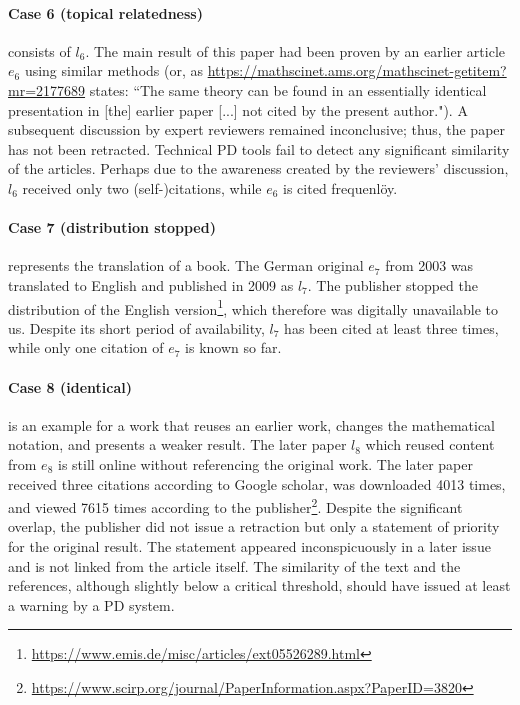 \documentclass{llncs}
\begin{document}
\paragraph{Case 6 (topical relatedness)} consists of $l_6$. The main result of this paper had been proven by an earlier article $e_6$ using similar methods (or, as \url{https://mathscinet.ams.org/mathscinet-getitem?mr=2177689} states: ``The same theory can be found in an essentially identical presentation in [the] earlier paper [...] not cited by the present author."). A subsequent discussion by expert reviewers remained inconclusive; thus, the paper has not been retracted. Technical PD tools fail to detect any significant similarity of the articles. Perhaps due to the awareness created by the reviewers' discussion, $l_6$ received only two (self-)citations, while $e_6$ is cited frequenlöy.

\paragraph{Case 7 (distribution stopped)} represents the translation of a book. The German original $e_7$ from 2003 was translated to English and published in 2009 as $l_7$.
The publisher stopped the distribution of the English version\footnote{\url{https://www.emis.de/misc/articles/ext05526289.html}}, which therefore was digitally unavailable to us. Despite its short period of availability, $l_7$ has been cited at least three times, while only one citation of $e_7$ is known so far.

\paragraph{Case 8 (identical)} is an example for a work that reuses an earlier work, changes the mathematical notation, and presents a weaker result. The later paper $l_8$ which reused content from $e_8$ is still online without referencing the original work. The later paper received three citations according to Google scholar, was downloaded 4013 times, and viewed 7615 times according to the publisher\footnote{\url{https://www.scirp.org/journal/PaperInformation.aspx?PaperID=3820}}. Despite the significant overlap, the publisher did not issue a retraction but only a statement of priority for the original result. The statement appeared inconspicuously in a later issue and is not linked from the article itself. The similarity of the text and the references, although slightly below a critical threshold, should have issued at least a warning by a PD system.
\end{document}
